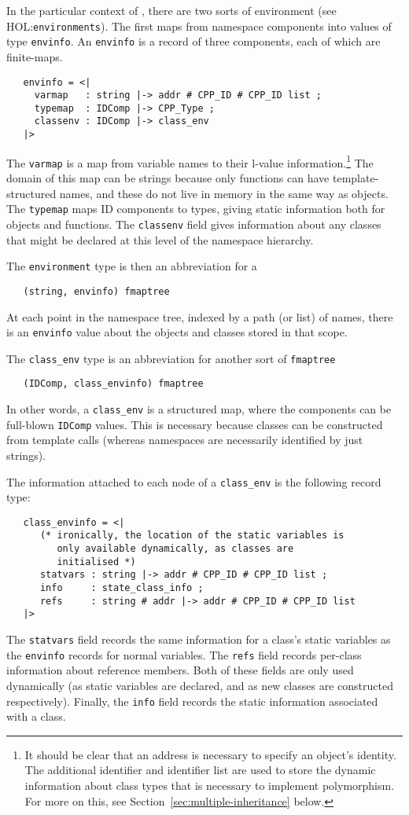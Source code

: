 \documentclass[11pt]{article}
\newcommand{\HOLfile}[1]{HOL:\texttt{#1}}
\begin{document}
In the particular context of \cpp{}, there are two sorts of
environment (see \HOLfile{environments}).  The first maps from
namespace components into values of type \texttt{envinfo}.  An
\texttt{envinfo} is a record of three components, each of which are
finite-maps.
\begin{verbatim}
   envinfo = <|
     varmap   : string |-> addr # CPP_ID # CPP_ID list ;
     typemap  : IDComp |-> CPP_Type ;
     classenv : IDComp |-> class_env
   |>
\end{verbatim}
The \texttt{varmap} is a map from variable names to their l-value
information.\footnote{It should be clear that an address is necessary
  to specify an object's identity.  The additional identifier and
  identifier list are used to store the dynamic information about
  class types that is necessary to implement polymorphism.  For more
  on this, see Section~\ref{sec:multiple-inheritance} below.}  The
domain of this map can be strings because only functions can have
template-structured names, and these do not live in memory in the same
way as objects.  The \texttt{typemap} maps ID components to types,
giving static information both for objects and functions.  The
\texttt{classenv} field gives information about any classes that might
be declared at this level of the namespace hierarchy.

The \texttt{environment} type is then an abbreviation for a
\begin{verbatim}
   (string, envinfo) fmaptree
\end{verbatim}
At each point in the namespace tree, indexed by a path (or list) of
names, there is an \texttt{envinfo} value about the objects and
classes stored in that scope.

The \texttt{class_env} type is an abbreviation for another sort of
\texttt{fmaptree}
\begin{verbatim}
   (IDComp, class_envinfo) fmaptree
\end{verbatim}
In other words, a \texttt{class_env} is a structured map, where the
components can be full-blown \texttt{IDComp} values.  This is
necessary because classes can be constructed from template calls
(whereas namespaces are necessarily identified by just strings).

The information attached to each node of a \texttt{class_env} is the
following record type:
\begin{verbatim}
   class_envinfo = <|
      (* ironically, the location of the static variables is 
         only available dynamically, as classes are 
         initialised *)
      statvars : string |-> addr # CPP_ID # CPP_ID list ;
      info     : state_class_info ;
      refs     : string # addr |-> addr # CPP_ID # CPP_ID list
   |>
\end{verbatim}
The \texttt{statvars} field records the same information for a class's
static variables as the \texttt{envinfo} records for normal
variables.  The \texttt{refs} field records per-class information
about reference members.  Both of these fields are only used
dynamically (as static variables are declared, and as new classes are
constructed respectively).  Finally, the \texttt{info} field records
the static information associated with a class. 
\end{document}
